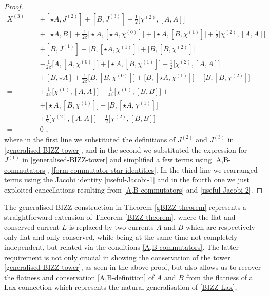 \documentclass[12pt]{article}
\numberwithin{equation}{section}
\begin{document}
\begin{proof}
\begin{equation}
\begin{aligned}
X^{(3)}=&+[\star A,J^{(2)}]+[B,J^{(3)}]+\tfrac{1}{2}\bigl[\chi^{(2)},[A,A]\bigr]
\\
=&+[\star A,B]+\tfrac{1}{2\beta}\bigl[\star A,[\star A,\chi^{(0)}]\bigr]+\bigl[\star A,[B,\chi^{(1)}]\bigr]+\tfrac{1}{2}\bigl[\chi^{(2)},[A,A]\bigr]
\\
&+[B,J^{(1)}]+\bigl[B,[\star A,\chi^{(1)}]\bigr]+\bigl[B,[B,\chi^{(2)}]\bigr]
\\
=&-\tfrac{1}{2\beta}\bigl[A,[A,\chi^{(0)}]\bigr]+\bigl[\star A,[B,\chi^{(1)}]\bigr]+\tfrac{1}{2}\bigl[\chi^{(2)},[A,A]\bigr]
\\
&+[B,\star A]+\tfrac{1}{2\beta}\bigl[B,[B,\chi^{(0)}]\bigr]+\bigl[B,[\star A,\chi^{(1)}]\bigr]+\bigl[B,[B,\chi^{(2)}]\bigr]
\\
=&+\tfrac{1}{4\beta}\bigl[\chi^{(0)},[A,A]\bigr]-\tfrac{1}{4\beta}\bigl[\chi^{(0)},[B,B]\bigr]+
\\
&+\bigl[\star A,[B,\chi^{(1)}]\bigr]+\bigl[B,[\star A,\chi^{(1)}]\bigr]
\\
&+\tfrac{1}{2}\bigl[\chi^{(2)},[A,A]\bigr]-\tfrac{1}{2}\bigl[\chi^{(2)},[B,B]\bigr]
\\
=&0 \,\, ,
\end{aligned}
\end{equation}
where in the first line we substituted the definitions of $J^{(2)}$ and $J^{(3)}$ in \eqref{generalised-BIZZ-tower}, and in the second we substituted the expression for $J^{(1)}$ in \eqref{generalised-BIZZ-tower} and simplified a few terms using \eqref{A,B-commutators}, \eqref{form-commutator-star-identities}. In the third line we rearranged terms using the Jacobi identity \eqref{useful-Jacobi-1} and in the fourth one we just exploited cancellations resulting from \eqref{A,B-commutators} and \eqref{useful-Jacobi-2}.
\end{proof}
The generalised BIZZ construction in Theorem \ref{gBIZZ-theorem} represents a straightforward extension of Theorem \ref{BIZZ-theorem}, where the flat and conserved current $L$ is replaced by two currents $A$ and $B$ which are respectively only flat and only conserved, while being at the same time not completely independent, but related via the conditions \eqref{A,B-commutators}. The latter requirement is not only crucial in showing the conservation of the tower \eqref{generalised-BIZZ-tower}, as seen in the above proof, but also allows us to recover the flatness and conservation \eqref{A,B-definition} of $A$ and $B$ from the flatness of a Lax connection which represents the natural generalisation of \eqref{BIZZ-Lax},
\end{document}
